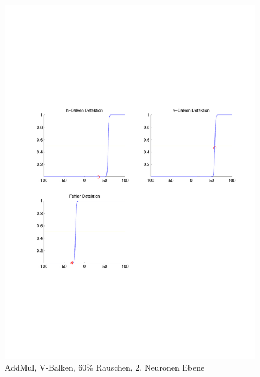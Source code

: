 \begin{figure}[hbt]
\begin{minipage}{0.8 \textwidth}
		\includegraphics[width=\textwidth]{./Bilder/Auswertung/Endergebnis/TypeAddMul_Rauschen60_V_Line_Layer2}
		\caption{AddMul, V-Balken, 60\% Rauschen, 2. Neuronen Ebene}
		\label{AddMul_V_60_2}
	\end{minipage}
\end{figure}

